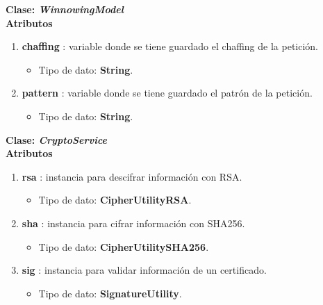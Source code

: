 \documentclass[12pt, a4paper, titlepage]{report}
\begin{document}
			    
                
                \textbf{\textcolor{guindapoli}{Clase: \textit{WinnowingModel}}}\\
                    
                    \textbf{Atributos}
                    \begin{enumerate}
    		            \item \textbf{chaffing} : variable donde se tiene guardado el chaffing de la petición.
        		        \begin{itemize}
        		            \item Tipo de dato: \textbf{String}.
        		        \end{itemize}
        		        \item \textbf{pattern} : variable donde se tiene guardado el patrón de la petición.
        		        \begin{itemize}
        		            \item Tipo de dato: \textbf{String}.
        		        \end{itemize}
                    \end{enumerate}


                   
                \textbf{\textcolor{guindapoli}{Clase: \textit{CryptoService}}}\\
                    
                    \textbf{Atributos}
                    \begin{enumerate}
    		            \item \textbf{rsa} : instancia para descifrar información con RSA.
        		        \begin{itemize}
        		            \item Tipo de dato: \textbf{CipherUtilityRSA}.
        		        \end{itemize}
        		        \item \textbf{sha} : instancia para cifrar información con SHA256.
        		        \begin{itemize}
        		            \item Tipo de dato: \textbf{CipherUtilitySHA256}.
        		        \end{itemize}
        		        \item \textbf{sig} : instancia para validar información de un certificado.
        		        \begin{itemize}
        		            \item Tipo de dato: \textbf{SignatureUtility}.
        		        \end{itemize}
                    \end{enumerate}
                    
\end{document}
